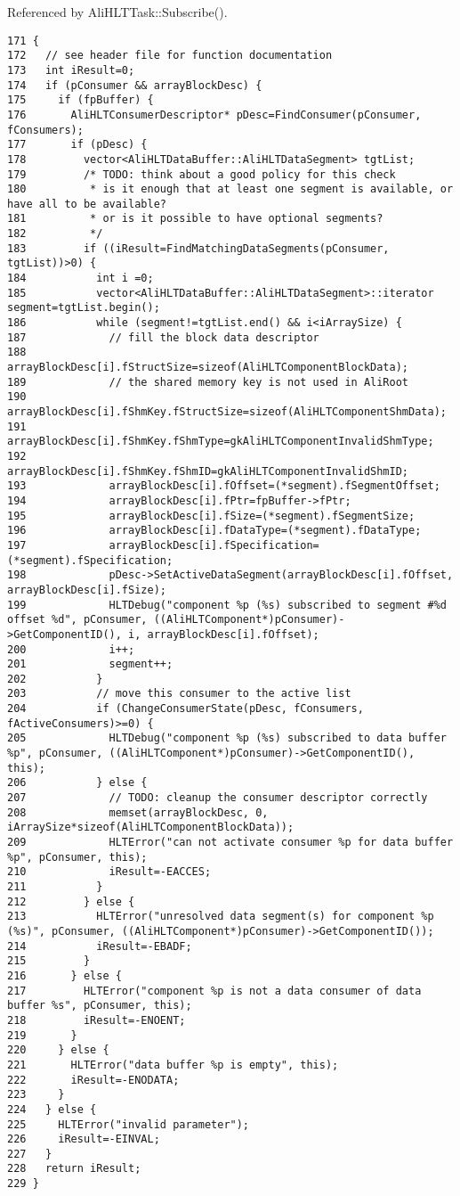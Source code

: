 Referenced by Ali\-HLTTask::Subscribe().

\footnotesize\begin{verbatim}171 {
172   // see header file for function documentation
173   int iResult=0;
174   if (pConsumer && arrayBlockDesc) {
175     if (fpBuffer) {
176       AliHLTConsumerDescriptor* pDesc=FindConsumer(pConsumer, fConsumers);
177       if (pDesc) {
178         vector<AliHLTDataBuffer::AliHLTDataSegment> tgtList;
179         /* TODO: think about a good policy for this check
180          * is it enough that at least one segment is available, or have all to be available?
181          * or is it possible to have optional segments?
182          */
183         if ((iResult=FindMatchingDataSegments(pConsumer, tgtList))>0) {
184           int i =0;
185           vector<AliHLTDataBuffer::AliHLTDataSegment>::iterator segment=tgtList.begin();
186           while (segment!=tgtList.end() && i<iArraySize) {
187             // fill the block data descriptor
188             arrayBlockDesc[i].fStructSize=sizeof(AliHLTComponentBlockData);
189             // the shared memory key is not used in AliRoot
190             arrayBlockDesc[i].fShmKey.fStructSize=sizeof(AliHLTComponentShmData);
191             arrayBlockDesc[i].fShmKey.fShmType=gkAliHLTComponentInvalidShmType;
192             arrayBlockDesc[i].fShmKey.fShmID=gkAliHLTComponentInvalidShmID;
193             arrayBlockDesc[i].fOffset=(*segment).fSegmentOffset;
194             arrayBlockDesc[i].fPtr=fpBuffer->fPtr;
195             arrayBlockDesc[i].fSize=(*segment).fSegmentSize;
196             arrayBlockDesc[i].fDataType=(*segment).fDataType;
197             arrayBlockDesc[i].fSpecification=(*segment).fSpecification;
198             pDesc->SetActiveDataSegment(arrayBlockDesc[i].fOffset, arrayBlockDesc[i].fSize);
199             HLTDebug("component %p (%s) subscribed to segment #%d offset %d", pConsumer, ((AliHLTComponent*)pConsumer)->GetComponentID(), i, arrayBlockDesc[i].fOffset);
200             i++;
201             segment++;
202           }
203           // move this consumer to the active list
204           if (ChangeConsumerState(pDesc, fConsumers, fActiveConsumers)>=0) {
205             HLTDebug("component %p (%s) subscribed to data buffer %p", pConsumer, ((AliHLTComponent*)pConsumer)->GetComponentID(), this);
206           } else {
207             // TODO: cleanup the consumer descriptor correctly
208             memset(arrayBlockDesc, 0, iArraySize*sizeof(AliHLTComponentBlockData));
209             HLTError("can not activate consumer %p for data buffer %p", pConsumer, this);
210             iResult=-EACCES;
211           }
212         } else {
213           HLTError("unresolved data segment(s) for component %p (%s)", pConsumer, ((AliHLTComponent*)pConsumer)->GetComponentID());
214           iResult=-EBADF;
215         }
216       } else {
217         HLTError("component %p is not a data consumer of data buffer %s", pConsumer, this);
218         iResult=-ENOENT;
219       }
220     } else {
221       HLTError("data buffer %p is empty", this);
222       iResult=-ENODATA;
223     }
224   } else {
225     HLTError("invalid parameter");
226     iResult=-EINVAL;
227   }
228   return iResult;
229 }
\end{verbatim}\normalsize 





